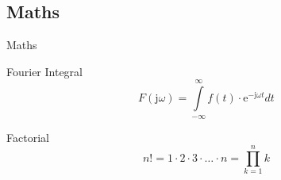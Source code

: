 \documentclass[compress]{beamer}
\begin{document}
\subsection{Maths}
\begin{frame}{Maths}
    \begin{block}{Fourier Integral}
        \begin{equation*}
            F(\textrm{j}\omega) = \int\limits_{-\infty}^{\infty} f(t)\cdot\textrm{e}^{-\textrm{j}\omega t} dt
        \end{equation*}
    \end{block}
    \begin{block}{Factorial}
        \begin{equation*}
            n! = 1\cdot 2 \cdot 3 \cdot\ldots\cdot n = \prod_{k=1}^n k
        \end{equation*}
    \end{block}
\end{frame}




\end{document}
